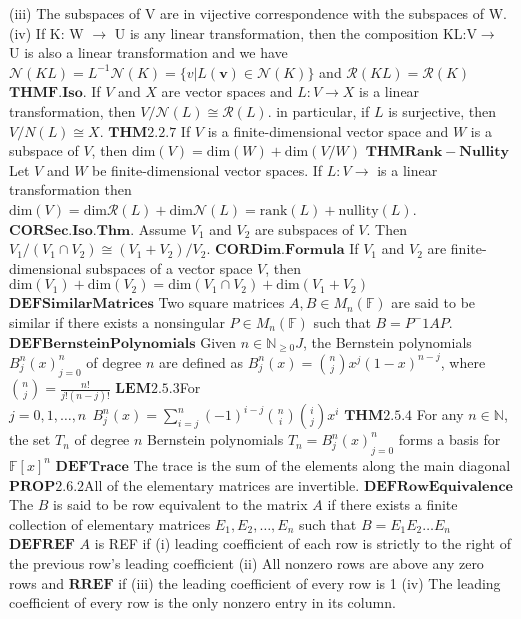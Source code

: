 \documentclass[8pt]{extarticle}
\theoremstyle{definition}
\begin{document}
{(iii) The subspaces of V are in vijective correspondence with the subspaces of W.
(iv) If K: W $\rightarrow$ U is any linear transformation, then the composition KL:V$\rightarrow$ U is also a linear transformation and we have $\mathscr{N}(KL) = L^{-1} \mathscr{N} (K) = \{v | L(\mathbf{v}) \in \mathscr{N} (K)\}$ and $\mathscr{R} (KL) = \mathscr{R} (K)$
$\mathbf{THM F.Iso.} $ If $V$ and $X$ are vector spaces and $L: V\rightarrow X$ is a linear transformation, then $V/\mathscr{N} (L) \cong \mathscr{R} (L)$. in particular, if $L$ is surjective, then $V/N(L) \cong X$.
$\mathbf{THM2.2.7}$ If $V$ is a finite-dimensional vector space and $W$ is a subspace of $V$, then $\text{dim} (V) = \text{dim} (W) + \text{dim} (V/W) $
$\mathbf{THM Rank-Nullity}$ Let $V$ and $W$ be finite-dimensional vector spaces. If $L:V \rightarrow $ is a linear transformation then $\text{dim} (V) = \text{dim} \mathscr{R} (L) + \text{dim} \mathscr{N} (L) = \text{rank} (L) + \text{nullity} (L)$.
$\mathbf{COR Sec. Iso. Thm.}$ Assume $V_1$ and $V_2$ are subspaces of $V$. Then $V_1/(V_1 \cap V_2) \cong (V_1 + V_2)/V_2$.
$\mathbf{COR Dim. Formula}$ If $V_1$ and $V_2$ are finite-dimensional subspaces of a vector space $V$, then $\text{dim} (V_1) + \text{dim} (V_2) = \text{dim} (V_1 \cap V_2) + \text{dim} (V_1 + V_2)$
$\mathbf{DEF Similar Matrices} $ Two square matrices $A,B \in M_n(\mathbb{F} )$ are said to be similar if there exists a nonsingular $P \in M_n(\mathbb{F} )$ such that $B = P^-1AP$.
$\mathbf{DEF Bernstein Polynomials} $ Given $n \in \mathbb{N}_{\geq 0}J$, the Bernstein polynomials ${B_j^n(x)}_{j=0}^n$ of degree $n$ are defined as $B_j^n(x) = \binom nj x^j(1-x)^{n-j}$, where $\binom nj = \frac{n!}{j!(n-j)!}$
$\mathbf{LEM 2.5.3}$For $j = 0,1,\dots,n ~ ~ B_j^n(x) = \sum^{n}_{i=j}(-1)^{i-j} \binom ni \binom ij x^i $
$\mathbf{THM2.5.4}$ For any $n \in \mathbb{N}$, the set $T_n$ of degree $n$ Bernstein polynomials $T_n = {B_j^n (x) }_{j=0}^n$ forms a basis for $\mathbb{F}[x]^n $
$\mathbf{DEF Trace}$ The trace is the sum of the elements along the main diagonal
$\mathbf{PROP2.6.2}$All of the elementary matrices are invertible.
$\mathbf{DEF Row Equivalence}$The $B$ is said to be row equivalent to the matrix $A$ if there exists a finite collection of elementary matrices $E_1,E_2,\dots, E_n$ such that $B = E_1E_2\dots E_n$
$\mathbf{DEF REF}$ $A$ is REF if (i) leading coefficient of each row is strictly to the right of the previous row's leading coefficient (ii) All nonzero rows are above any zero rows and $ \mathbf{RREF} $ if (iii) the leading coefficient of every row is 1 (iv) The leading coefficient of every row is the only nonzero entry in its column.
}
\end{document}
